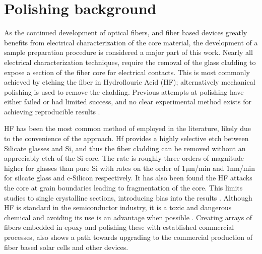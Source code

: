 


\section{Polishing background}

As the continued development of optical fibers, and fiber based devices greatly benefits from electrical characterization of the core material, the development of a sample preparation procedure is considered a major part of this work. Nearly all electrical characterization techniques, require the removal of the glass cladding to expose a section of the fiber core for electrical contacts. This is most commonly achieved by etching the fiber in Hydroflouric Acid (HF); alternatively mechanical polishing is used to remove the cladding. Previous attempts at polishing have either failed or had limited success, and no clear experimental method exists for achieving reproducible results \cite{KristinKristin_thesis_final,LapointeElectricalFibres}. 

HF has been the most common method of employed in the literature, likely due to the convenience of the approach. Hf provides a highly selective etch between Silicate glasses and Si, and thus the fiber cladding can be removed without an appreciably etch of the Si core. The rate is roughly three orders of magnitude higher for glasses than pure Si with rates on the order of $1\si{\micro\meter}$/min \cite{Liu2013UnexpectedlyAcid} and $1\si{\nano\meter}$/min \cite{Park2017AApplication} for silcate glass and c-Silicon respectively. It has also been found the HF attacks the core at grain boundaries leading to fragmentation of the core. This limits studies to single crystalline sections, introducing bias into the results  \cite{LapointeElectricalFibres}. Although HF is standard in the semiconductor industry, it is a toxic and dangerous chemical and avoiding its use is an advantage when possible \cite{Product2015SafetySheet}. Creating arrays of fibers embedded in epoxy and polishing these with established commercial processes, also shows a path towards upgrading to the commercial production of fiber based solar cells \cite{} and other devices.  %



